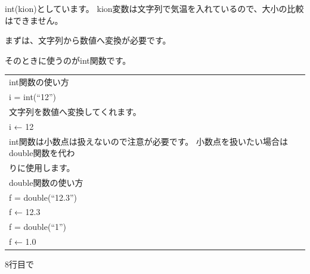 int(kion)としています。
kion変数は文字列で気温を入れているので、大小の比較はできません。

まずは、文字列から数値へ変換が必要です。

そのときに使うのがint関数です。











\begin{table}[htbp]
    \centering
    \begin{tabular}{|l|}
        \hline
        int関数の使い方\\
        i = int(“12”)\\
        文字列を数値へ変換してくれます。\\
        i ← 12 \\
        int関数は小数点は扱えないので注意が必要です。
	    小数点を扱いたい場合はdouble関数を代わ\\
      りに使用します。\\
        double関数の使い方\\
        f = double(“12.3”)\\
        f ← 12.3\\
        f = double(“1”)\\
        f ← 1.0\\
        \hline
    \end{tabular}
\end{table}



\bigskip

8行目で

